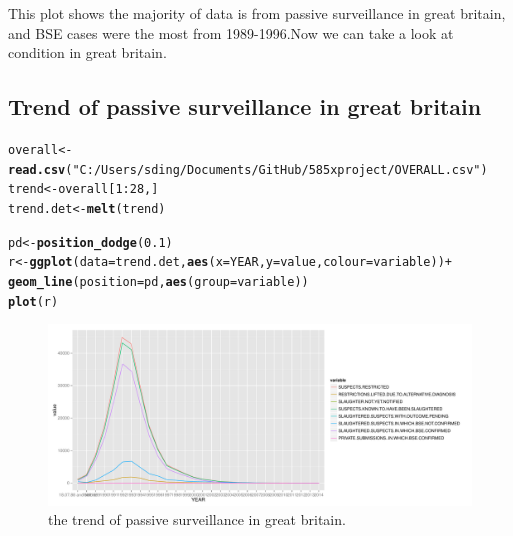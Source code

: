 \documentclass{article}\usepackage[]{graphicx}\usepackage[]{color}
\makeatletter
\newcommand{\hlnum}[1]{\textcolor[rgb]{0.686,0.059,0.569}{#1}}%
\newcommand{\hlstr}[1]{\textcolor[rgb]{0.192,0.494,0.8}{#1}}%
\newcommand{\hlopt}[1]{\textcolor[rgb]{0,0,0}{#1}}%
\newcommand{\hlstd}[1]{\textcolor[rgb]{0.345,0.345,0.345}{#1}}%
\newcommand{\hlkwb}[1]{\textcolor[rgb]{0.69,0.353,0.396}{#1}}%
\newcommand{\hlkwc}[1]{\textcolor[rgb]{0.333,0.667,0.333}{#1}}%
\newcommand{\hlkwd}[1]{\textcolor[rgb]{0.737,0.353,0.396}{\textbf{#1}}}%
\newenvironment{kframe}{%
 \def\at@end@of@kframe{}%
 \ifinner\ifhmode%
  \def\at@end@of@kframe{\end{minipage}}%
  \begin{minipage}{\columnwidth}%
 \fi\fi%
 \def\FrameCommand##1{\hskip\@totalleftmargin \hskip-\fboxsep
 \colorbox{shadecolor}{##1}\hskip-\fboxsep
     \hskip-\linewidth \hskip-\@totalleftmargin \hskip\columnwidth}%
 \MakeFramed {\advance\hsize-\width
   \@totalleftmargin\z@ \linewidth\hsize
   \@setminipage}}%
 {\par\unskip\endMakeFramed%
 \at@end@of@kframe}
\newenvironment{knitrout}{}{} %
\makeatother
\begin{document}
\begin{knitrout}
\end{knitrout}


This plot shows the majority of data is from passive surveillance in great britain, and BSE cases were the most from 1989-1996.Now we can take a look at condition in great britain.

\subsection{Trend of passive surveillance in great britain}

\begin{knitrout}\footnotesize
{}\color{fgcolor}\begin{kframe}
\begin{alltt}
\hlstd{overall} \hlkwb{<-} \hlkwd{read.csv}\hlstd{(}\hlstr{"C:/Users/sding/Documents/GitHub/585xproject/OVERALL.csv"}\hlstd{)}
\hlstd{trend} \hlkwb{<-} \hlstd{overall[}\hlnum{1}\hlopt{:}\hlnum{28}\hlstd{, ]}
\hlstd{trend.det} \hlkwb{<-} \hlkwd{melt}\hlstd{(trend)}
\end{alltt}


{\ttfamily\noindent\itshape\color{messagecolor}{\#\# Using YEAR as id variables}}\begin{alltt}
\hlstd{pd} \hlkwb{<-} \hlkwd{position_dodge}\hlstd{(}\hlnum{0.1}\hlstd{)}
\hlstd{r} \hlkwb{<-} \hlkwd{ggplot}\hlstd{(}\hlkwc{data} \hlstd{= trend.det,} \hlkwd{aes}\hlstd{(}\hlkwc{x} \hlstd{= YEAR,} \hlkwc{y} \hlstd{= value,} \hlkwc{colour} \hlstd{= variable))} \hlopt{+}
    \hlkwd{geom_line}\hlstd{(}\hlkwc{position} \hlstd{= pd,} \hlkwd{aes}\hlstd{(}\hlkwc{group} \hlstd{= variable))}
\hlkwd{plot}\hlstd{(r)}
\end{alltt}


{\ttfamily\noindent\itshape\color{messagecolor}{\#\# ymax not defined: adjusting position using y instead}}\end{kframe}\begin{figure}[H]

\includegraphics[width=\textwidth]{figure/GB} \caption[the trend of passive surveillance in great britain]{the trend of passive surveillance in great britain.\label{fig:GB}}
\end{figure}


\end{knitrout}
\end{document}
